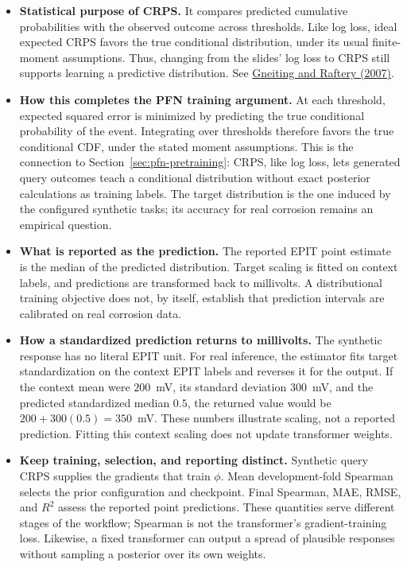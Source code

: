 \documentclass[11pt]{article}
\newenvironment{notes}
  {\begin{itemize}\setlength{\itemsep}{0.45em}\setlength{\parsep}{0pt}}
  {\end{itemize}}
\begin{document}
\begin{notes}
    \item \textbf{Statistical purpose of CRPS.} It compares
    predicted cumulative probabilities with the observed
    outcome across thresholds. Like log loss, ideal expected
    CRPS favors the true conditional distribution, under its
    usual finite-moment assumptions. Thus, changing from the
    slides' log loss to CRPS still supports learning a
    predictive distribution. See
    \href{https://doi.org/10.1198/016214506000001437}
    {Gneiting and Raftery (2007)}.

    \item \textbf{How this completes the PFN training argument.}
    At each threshold, expected squared error is minimized by
    predicting the true conditional probability of the event.
    Integrating over thresholds therefore favors the true
    conditional CDF, under the stated moment assumptions.
    This is the connection to Section~\ref{sec:pfn-pretraining}:
    CRPS, like log loss, lets generated query outcomes teach a
    conditional distribution without exact posterior calculations
    as training labels. The target distribution is the one induced
    by the configured synthetic tasks; its accuracy for real
    corrosion remains an empirical question.

    \item \textbf{What is reported as the prediction.} The
    reported EPIT point estimate is the median of the predicted
    distribution. Target scaling is fitted on context labels,
    and predictions are transformed back to millivolts.
    A distributional training objective does not, by itself,
    establish that prediction intervals are calibrated on real
    corrosion data.

    \item \textbf{How a standardized prediction returns to millivolts.}
    The synthetic response has no literal EPIT unit. For real
    inference, the estimator fits target standardization on the
    context EPIT labels and reverses it for the output. If the
    context mean were \(200\)~mV, its standard deviation
    \(300\)~mV, and the predicted standardized median \(0.5\),
    the returned value would be \(200+300(0.5)=350\)~mV.
    These numbers illustrate scaling, not a reported prediction.
    Fitting this context scaling does not update transformer weights.

    \item \textbf{Keep training, selection, and reporting distinct.}
    Synthetic query CRPS supplies the gradients that train
    \(\phi\). Mean development-fold Spearman selects the prior
    configuration and checkpoint. Final Spearman, MAE, RMSE,
    and \(R^2\) assess the reported point predictions.
    These quantities serve different stages of the workflow;
    Spearman is not the transformer's gradient-training loss.
    Likewise, a fixed transformer can output a spread of plausible
    responses without sampling a posterior over its own weights.
\end{notes}
\end{document}

